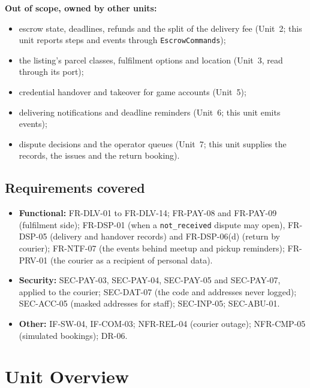 \documentclass[11pt,a4paper]{article}
\begin{document}
\textbf{Out of scope, owned by other units:}
\begin{itemize}[nosep]
  \item escrow state, deadlines, refunds and the split of the delivery fee (Unit~2; this unit reports steps and events through \texttt{EscrowCommands});
  \item the listing's parcel classes, fulfilment options and location (Unit~3, read through its port);
  \item credential handover and takeover for game accounts (Unit~5);
  \item delivering notifications and deadline reminders (Unit~6; this unit emits events);
  \item dispute decisions and the operator queues (Unit~7; this unit supplies the records, the issues and the return booking).
\end{itemize}

\subsection{Requirements covered}
\begin{itemize}[nosep]
  \item \textbf{Functional:} FR-DLV-01 to FR-DLV-14; FR-PAY-08 and FR-PAY-09 (fulfilment side); FR-DSP-01 (when a \texttt{not\_received} dispute may open), FR-DSP-05 (delivery and handover records) and FR-DSP-06(d) (return by courier); FR-NTF-07 (the events behind meetup and pickup reminders); FR-PRV-01 (the courier as a recipient of personal data).
  \item \textbf{Security:} SEC-PAY-03, SEC-PAY-04, SEC-PAY-05 and SEC-PAY-07, applied to the courier; SEC-DAT-07 (the code and addresses never logged); SEC-ACC-05 (masked addresses for staff); SEC-INP-05; SEC-ABU-01.
  \item \textbf{Other:} IF-SW-04, IF-COM-03; NFR-REL-04 (courier outage); NFR-CMP-05 (simulated bookings); DR-06.
\end{itemize}

\section{Unit Overview}
\end{document}
